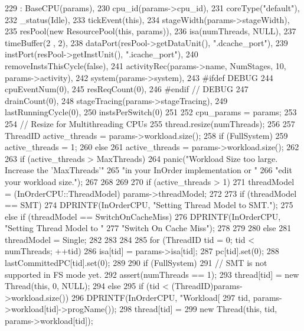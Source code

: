 \begin{DoxyCode}
229     : BaseCPU(params),
230       cpu_id(params->cpu_id),
231       coreType("default"),
232       _status(Idle),
233       tickEvent(this),
234       stageWidth(params->stageWidth),
235       resPool(new ResourcePool(this, params)),
236       isa(numThreads, NULL),
237       timeBuffer(2 , 2),
238       dataPort(resPool->getDataUnit(), ".dcache_port"),
239       instPort(resPool->getInstUnit(), ".icache_port"),
240       removeInstsThisCycle(false),
241       activityRec(params->name, NumStages, 10, params->activity),
242       system(params->system),
243 #ifdef DEBUG
244       cpuEventNum(0),
245       resReqCount(0),
246 #endif // DEBUG
247       drainCount(0),
248       stageTracing(params->stageTracing),
249       lastRunningCycle(0),
250       instsPerSwitch(0)
251 {    
252     cpu_params = params;
253 
254     // Resize for Multithreading CPUs
255     thread.resize(numThreads);
256 
257     ThreadID active_threads = params->workload.size();
258     if (FullSystem) {
259         active_threads = 1;
260     } else {
261         active_threads = params->workload.size();
262 
263         if (active_threads > MaxThreads) {
264             panic("Workload Size too large. Increase the 'MaxThreads'"
265                   "in your InOrder implementation or "
266                   "edit your workload size.");
267         }
268 
269 
270         if (active_threads > 1) {
271             threadModel = (InOrderCPU::ThreadModel) params->threadModel;
272 
273             if (threadModel == SMT) {
274                 DPRINTF(InOrderCPU, "Setting Thread Model to SMT.\n");
275             } else if (threadModel == SwitchOnCacheMiss) {
276                 DPRINTF(InOrderCPU, "Setting Thread Model to "
277                         "Switch On Cache Miss\n");
278             }
279 
280         } else {
281             threadModel = Single;
282         }
283     }
284 
285     for (ThreadID tid = 0; tid < numThreads; ++tid) {
286         isa[tid] = params->isa[tid];
287         pc[tid].set(0);
288         lastCommittedPC[tid].set(0);
289 
290         if (FullSystem) {
291             // SMT is not supported in FS mode yet.
292             assert(numThreads == 1);
293             thread[tid] = new Thread(this, 0, NULL);
294         } else {
295             if (tid < (ThreadID)params->workload.size()) {
296                 DPRINTF(InOrderCPU, "Workload[%
297                         tid, params->workload[tid]->progName());
298                 thread[tid] =
299                     new Thread(this, tid, params->workload[tid]);
}}}}
\end{DoxyCode}
